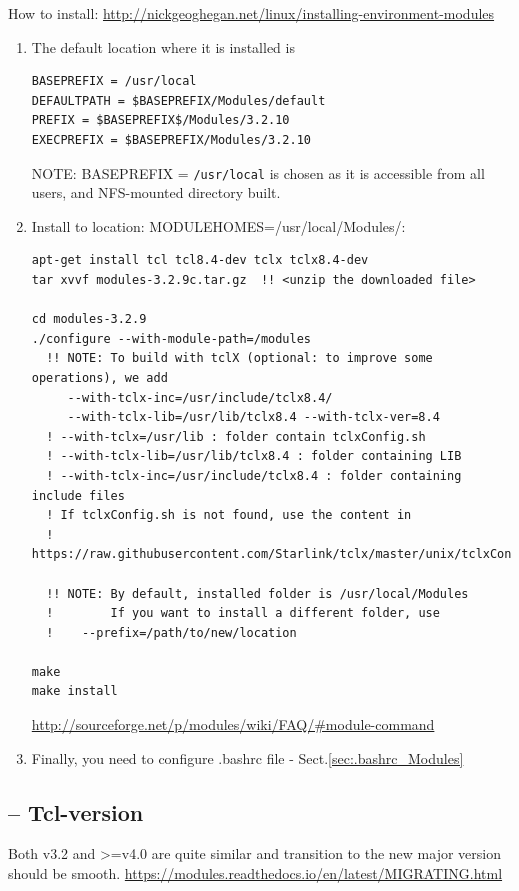 How to install:
\url{http://nickgeoghegan.net/linux/installing-environment-modules}
\begin{enumerate}
  
  \item  The default location where it is installed is

\begin{verbatim}
BASEPREFIX = /usr/local
DEFAULTPATH = $BASEPREFIX/Modules/default
PREFIX = $BASEPREFIX$/Modules/3.2.10
EXECPREFIX = $BASEPREFIX/Modules/3.2.10
\end{verbatim}

NOTE: BASEPREFIX = \verb!/usr/local! is chosen  as it is accessible from all
users, and NFS-mounted directory built.

  \item Install to location: MODULEHOMES=/usr/local/Modules/:

{\small
\begin{verbatim}
apt-get install tcl tcl8.4-dev tclx tclx8.4-dev
tar xvvf modules-3.2.9c.tar.gz  !! <unzip the downloaded file>

cd modules-3.2.9
./configure --with-module-path=/modules 
  !! NOTE: To build with tclX (optional: to improve some operations), we add
     --with-tclx-inc=/usr/include/tclx8.4/ 
     --with-tclx-lib=/usr/lib/tclx8.4 --with-tclx-ver=8.4
  ! --with-tclx=/usr/lib : folder contain tclxConfig.sh 
  ! --with-tclx-lib=/usr/lib/tclx8.4 : folder containing LIB
  ! --with-tclx-inc=/usr/include/tclx8.4 : folder containing include files
  ! If tclxConfig.sh is not found, use the content in
  ! https://raw.githubusercontent.com/Starlink/tclx/master/unix/tclxConfig.sh.in
  
  !! NOTE: By default, installed folder is /usr/local/Modules
  !        If you want to install a different folder, use 
  !    --prefix=/path/to/new/location
  
make 
make install
\end{verbatim}
}
\url{http://sourceforge.net/p/modules/wiki/FAQ/#module-command}

   \item Finally, you need to configure .bashrc file -
   Sect.\ref{sec:.bashrc_Modules}
\end{enumerate}

\subsection{-- Tcl-version}

Both v3.2 and >=v4.0 are quite similar and transition to the new major version
should be smooth.
\url{https://modules.readthedocs.io/en/latest/MIGRATING.html}

